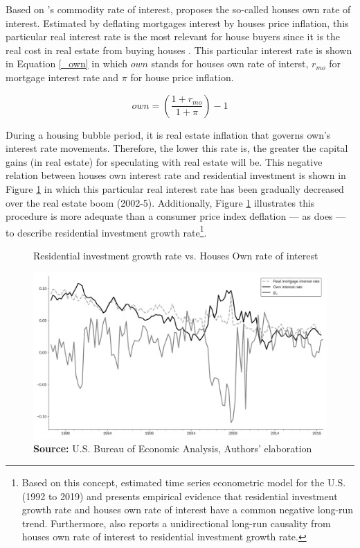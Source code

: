 \documentclass[12pt, a4]{article}
\begin{document}
Based on \citeauthor*{Sraffa_Own_1932}'s \citeyear{Sraffa_Own_1932} commodity rate of interest, \textcite{teixeira_crescimento_2015} proposes the so-called houses own rate of interest.
Estimated by deflating mortgages interest by houses price inflation, this particular real interest rate is the most relevant for house buyers since it is the real cost in real estate from buying houses  \cite[p.~53]{teixeira_crescimento_2015}.
This particular interest rate is shown in Equation \ref{_own} in which \(own\) stands for houses own rate of interst, \(r_{mo}\) for mortgage interest rate and \(\pi\) for house price inflation.


\begin{equation}
\label{_own}
own = \left(\frac{1+r_{mo}}{1+\pi}\right) -1
\end{equation}

During a housing bubble period, it is real estate inflation that governs own's interest rate movements. Therefore, the lower this rate is, the greater the capital gains (in real estate) for speculating with real estate will be. This negative relation between houses own interest rate and residential investment is shown in Figure \ref{propria_investo} in which this particular real interest rate has been gradually decreased over the real estate boom (2002-5).
Additionally, Figure \ref{propria_investo} illustrates this procedure is more adequate than a consumer price index deflation --- as \textcite[p.~143--6]{fair_macroeconometric_2013} does --- to describe residential investment growth rate\footnote{Based on this concept, \textcite{petrini_demanda_2019} estimated time series econometric model for the U.S. (1992 to 2019) and presents empirical evidence that residential investment growth rate and houses own rate of interest have a common negative long-run trend.  Furthermore, \textcite{petrini_demanda_2019} also reports a unidirectional long-run causality from houses own rate of interest to residential investment growth rate.}.


\begin{figure}[htb]
	\centering
	\caption{Residential investment growth rate vs. Houses Own rate of interest}
	\label{propria_investo}
	\includegraphics[width=.8\textwidth]{./figs/Own_gI}
	\caption*{\textbf{Source:} U.S. Bureau of Economic Analysis, Authors' elaboration}
\end{figure}
\end{document}

